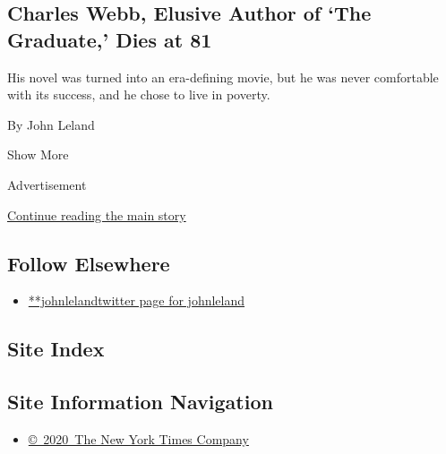 \begin{enumerate}
  \hypertarget{charles-webb-elusive-author-of-the-graduate-dies-at-81}{%
  \subsection{Charles Webb, Elusive Author of `The Graduate,' Dies at
  81}\label{charles-webb-elusive-author-of-the-graduate-dies-at-81}}

  His novel was turned into an era-defining movie, but he was never
  comfortable with its success, and he chose to live in poverty.

  By John Leland
\end{enumerate}

Show More

Advertisement

\protect\hyperlink{after-mid2}{Continue reading the main story}

\hypertarget{follow-elsewhere}{%
\subsection{Follow Elsewhere}\label{follow-elsewhere}}

\begin{itemize}
\tightlist
\item
  \href{https://twitter.com/johnleland}{**johnlelandtwitter page for
  johnleland}
\end{itemize}

\hypertarget{site-index}{%
\subsection{Site Index}\label{site-index}}

\hypertarget{site-information-navigation}{%
\subsection{Site Information
Navigation}\label{site-information-navigation}}

\begin{itemize}
\tightlist
\item
  \href{https://help.nytimes3xbfgragh.onion/hc/en-us/articles/115014792127-Copyright-notice}{©~2020~The
  New York Times Company}
\end{itemize}

